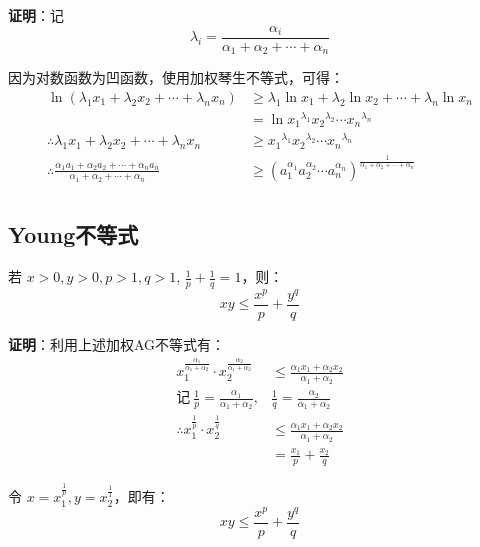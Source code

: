 \documentclass[12pt]{article}
\begin{document}
\textbf{证明}：记
$$
\lambda_i = \frac{\alpha_i}{\alpha_1 + \alpha_2 + \cdots + \alpha_n}
$$

因为对数函数为凹函数，使用加权琴生不等式，可得：
\begin{align*}
\ln(\lambda_1x_1 + \lambda_2x_2 + \cdots + \lambda_nx_n) &\ge \lambda_1\ln{x_1} + \lambda_2\ln{x_2} + \cdots + \lambda_n\ln{x_n} \\
	&= \ln{x_1}^{\lambda_1}{x_2}^{\lambda_2}\cdots{x_n}^{\lambda_n} \\
\therefore \lambda_1x_1 + \lambda_2x_2 + \cdots + \lambda_nx_n &\ge {x_1}^{\lambda_1}{x_2}^{\lambda_2}\cdots{x_n}^{\lambda_n}\\
\therefore \frac{\alpha_1a_1 + \alpha_2a_2 + \cdots + \alpha_na_n}{\alpha_1 + \alpha_2 + \cdots + \alpha_n} &\ge (a_1^{\alpha_1}a_2^{\alpha_2}\cdots a_n^{\alpha_n})^{\frac{1}{\alpha_1 + \alpha_2 + \cdots + \alpha_n}} \\
\end{align*}

\subsection{Young不等式}
\begin{mdframed}[
linecolor=black!40,outerlinewidth=1pt,roundcorner=.5em,innertopmargin=1ex,innerbottommargin=.5\baselineskip,innerrightmargin=1em,innerleftmargin=1em,backgroundcolor=gray!5,
]
若 $x > 0, y > 0, p > 1, q > 1$, $\frac{1}{p} + \frac{1}{q} = 1$，则：
$$
xy \le \frac{x^p}{p} + \frac{y^q}{q}
$$
\end{mdframed}
\textbf{证明}：利用上述加权AG不等式有：
\begin{align*}
x_1^{\frac{\alpha_1}{\alpha_1+\alpha_2}}\cdot x_2^{\frac{\alpha_2}{\alpha_1+\alpha_2}} &\le \frac{\alpha_1x_1 + \alpha_2x_2}{\alpha_1+\alpha_2} \\
\text{记} \ \frac{1}{p} = \frac{\alpha_1}{\alpha_1+\alpha_2}, & \frac{1}{q} = \frac{\alpha_2}{\alpha_1+\alpha_2} \\
\therefore x_1^{\frac{1}{p}} \cdot  x_2^{\frac{1}{q}} &\le \frac{\alpha_1x_1 + \alpha_2x_2}{\alpha_1+\alpha_2} \\
&= \frac{x_1}{p} + \frac{x_2}{q}
\end{align*}

令 $x = x_1^{\frac{1}{p}}, y = x_2^{\frac{1}{1}}$，即有：
$$
xy \le \frac{x^p}{p} + \frac{y^q}{q}
$$
\end{document}
